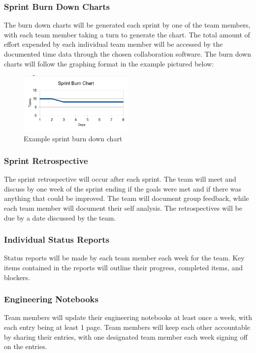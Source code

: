 \subsubsection{Sprint Burn Down Charts}
The burn down charts will be generated each sprint by one of the team members, with each team member taking a turn to generate the chart. The total amount of effort expended by each individual team member will be accessed by the documented time data through the chosen collaboration software. The burn down charts will follow the graphing format in the example pictured below: 


\begin{figure}[h!]
    \centering
    \includegraphics[width=0.5\textwidth]{images/example_burn_chart.png}
    \caption{Example sprint burn down chart}
\end{figure}

\subsubsection{Sprint Retrospective}
The sprint retrospective will occur after each sprint. The team will meet and discuss by one week of the sprint ending if the goals were met and if there was anything that could be improved. The team will document group feedback, while each team member will document their self analysis. The retrospectives will be due by a date discussed by the team.

\subsubsection{Individual Status Reports}
Status reports will be made by each team member each week for the team. Key items contained in the reports will outline their progress, completed items, and blockers.

\subsubsection{Engineering Notebooks}
Team members will update their engineering notebooks at least once a week, with each entry being at least 1 page. Team members will keep each other accountable by sharing their entries, with one designated team member each week signing off on the entries.

